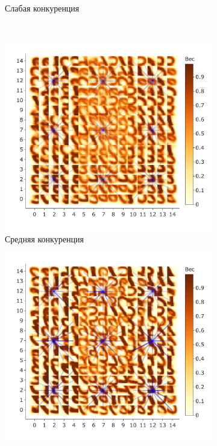 \documentclass[a4paper]{article}
\begin{document}
\begin{figure}[H]
\begin{subfigure}{0.45\textwidth}
    \caption{Слабая конкуренция}
\end{subfigure}
\\
\begin{subfigure}{0.45\textwidth}
    \includegraphics[width=\textwidth,keepaspectratio=true]{competition_on_XY_medium_good_ru.pdf}
    \caption{Средняя конкуренция}
\end{subfigure}
\begin{subfigure}{0.45\textwidth} 
    \includegraphics[width=\textwidth,keepaspectratio=true]{competition_on_XY_best_ru.pdf}

\end{subfigure}
\end{figure}
\end{document}
